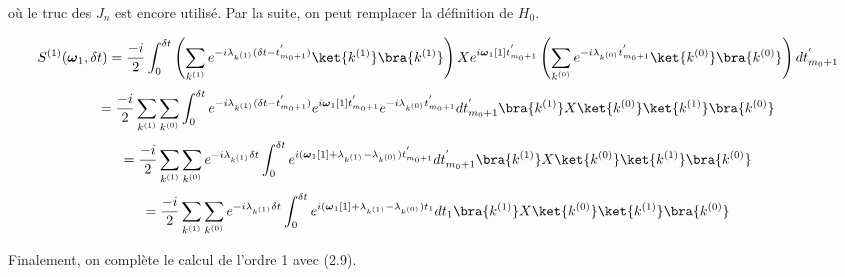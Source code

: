 où le truc des $J_n$ est encore utilisé. Par la suite, on peut remplacer la définition de $H_0$.

\begin{equation*}
    S^{(1)}(\boldsymbol{\omega}_1, \delta t) = \frac{-i}{2}\int_{0}^{\delta t}\left(\sum_{k^{(1)}}e^{-i\lambda_{k^{(1)}}(\delta t - t^{'}_{m_0 + 1})} \ket{k^{(1)}}\bra{k^{(1)}}\right)Xe^{i\boldsymbol{\omega}_1[1]t^{'}_{m_0+1}}\left(\sum_{k^{(0)}}e^{-i\lambda_{k^{(0)}} t^{'}_{m_0 + 1}} \ket{k^{(0)}}\bra{k^{(0)}}\right)dt^{'}_{m_0 + 1}
\end{equation*}
\begin{equation*}
    = \frac{-i}{2}\sum_{k^{(1)}}\sum_{k^{(0)}}\int_{0}^{\delta t}e^{-i\lambda_{k^{(1)}}(\delta t - t^{'}_{m_0 + 1})} e^{i\boldsymbol{\omega}_1[1]t^{'}_{m_0+1}}e^{-i\lambda_{k^{(0)}} t^{'}_{m_0 + 1}}dt^{'}_{m_0 + 1} \bra{k^{(1)}}X \ket{k^{(0)}}\ket{k^{(1)}}\bra{k^{(0)}}
\end{equation*}
\begin{equation*}
    = \frac{-i}{2}\sum_{k^{(1)}}\sum_{k^{(0)}}e^{-i\lambda_{k^{(1)}}\delta t}\int_{0}^{\delta t}e^{i(\boldsymbol{\omega}_1[1] + \lambda_{k^{(1)}} - \lambda_{k^{(0)}})t^{'}_{m_0 + 1}}dt^{'}_{m_0 + 1} \bra{k^{(1)}}X \ket{k^{(0)}}\ket{k^{(1)}}\bra{k^{(0)}}
\end{equation*}
\begin{equation*}
    = \frac{-i}{2}\sum_{k^{(1)}}\sum_{k^{(0)}}e^{-i\lambda_{k^{(1)}}\delta t}\int_{0}^{\delta t}e^{i(\boldsymbol{\omega}_1[1] + \lambda_{k^{(1)}} - \lambda_{k^{(0)}})t_1}dt_1 \bra{k^{(1)}}X \ket{k^{(0)}}\ket{k^{(1)}}\bra{k^{(0)}}
\end{equation*}

Finalement, on complète le calcul de l'ordre 1 avec (2.9).





